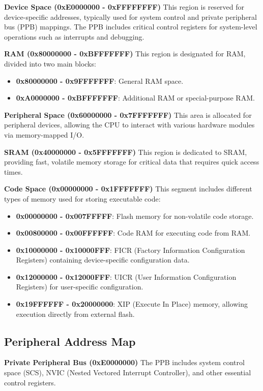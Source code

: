 \documentclass{Configuration_Files/PoliMi3i_thesis}
\begin{document}
\textbf{Device Space (0xE0000000 - 0xFFFFFFFF)}
This region is reserved for device-specific addresses, typically used for system control and private peripheral bus (PPB) mappings. The PPB includes critical control registers for system-level operations such as interrupts and debugging.

\textbf{RAM (0x80000000 - 0xBFFFFFFF)}
This region is designated for RAM, divided into two main blocks:
\begin{itemize}
    \item \textbf{0x80000000 - 0x9FFFFFFF}: General RAM space.
    \item \textbf{0xA0000000 - 0xBFFFFFFF}: Additional RAM or special-purpose RAM.
\end{itemize}

\textbf{Peripheral Space (0x60000000 - 0x7FFFFFFF)}
This area is allocated for peripheral devices, allowing the CPU to interact with various hardware modules via memory-mapped I/O.

\textbf{SRAM (0x40000000 - 0x5FFFFFFF)}
This region is dedicated to SRAM, providing fast, volatile memory storage for critical data that requires quick access times.

\textbf{Code Space (0x00000000 - 0x1FFFFFFF)}
This segment includes different types of memory used for storing executable code:
\begin{itemize}
    \item \textbf{0x00000000 - 0x007FFFFF}: Flash memory for non-volatile code storage.
    \item \textbf{0x00800000 - 0x00FFFFFF}: Code RAM for executing code from RAM.
    \item \textbf{0x10000000 - 0x10000FFF}: FICR (Factory Information Configuration Registers) containing device-specific configuration data.
    \item \textbf{0x12000000 - 0x12000FFF}: UICR (User Information Configuration Registers) for user-specific configuration.
    \item \textbf{0x19FFFFFF - 0x20000000}: XIP (Execute In Place) memory, allowing execution directly from external flash.
\end{itemize}

\subsection{Peripheral Address Map}

\textbf{Private Peripheral Bus (0xE0000000)}
The PPB includes system control space (SCS), NVIC (Nested Vectored Interrupt Controller), and other essential control registers.
\end{document}
